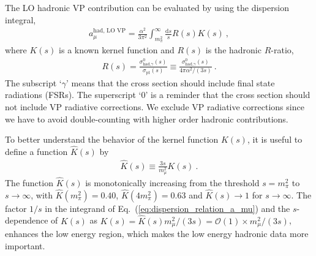 The LO hadronic VP contribution can be evaluated by using
the dispersion integral,
%
\begin{align}
 a_\mu^{\text{had, LO VP}} =
  \frac{\alpha^2}{3\pi^2} \int_{m_\pi^2}^{\infty}
   \frac{\text{d}s}{s} R(s) K(s)~,
\label{eq:dispersion_relation_a_mu}
\end{align}
%
where $K(s)$ is a known kernel function and
$R(s)$ is the hadronic $R$-ratio,
%
\begin{align}
 R(s) =
  \frac{\sigma^0_{\text{had,} \gamma}(s)}{\sigma_{\text{pt}}(s)}
\equiv
  \frac{\sigma^0_{\text{had,} \gamma}(s)}{4\pi \alpha^2/(3s)}~.
\end{align}
%
The subscript `$\gamma$' means that the cross section
should include final state radiations (FSRs).
The superscript `0' is a reminder that the cross section
should not include VP radiative corrections.  We exclude
VP radiative corrections since we have to avoid
double-counting with higher order hadronic contributions.



To better understand the behavior of the kernel function $K(s)$,
it is useful to define a function $\hat{K}(s)$ by
%
\begin{align}
 \hat{K}(s) \equiv \frac{3s}{m_\mu^2}K(s)~.
\end{align}
%
The function $\hat{K}(s)$ is monotonically increasing
from the threshold $s=m_\pi^2$ to $s \to \infty$, 
with $\hat{K}(m_\pi^2)=0.40$, $\hat{K}(4m_\pi^2)=0.63$
and $\hat{K}(s) \to 1$ for $s \to \infty$.
The factor $1/s$ in the integrand of 
Eq.~(\ref{eq:dispersion_relation_a_mu}) and the
$s$-dependence of $K(s)$ as $K(s)= \hat{K}(s) m_\mu^2/(3s)
= {\mathcal O}(1) \times m_\mu^2/(3s)$,
enhances the low energy region, which makes the 
low energy hadronic data more important.




